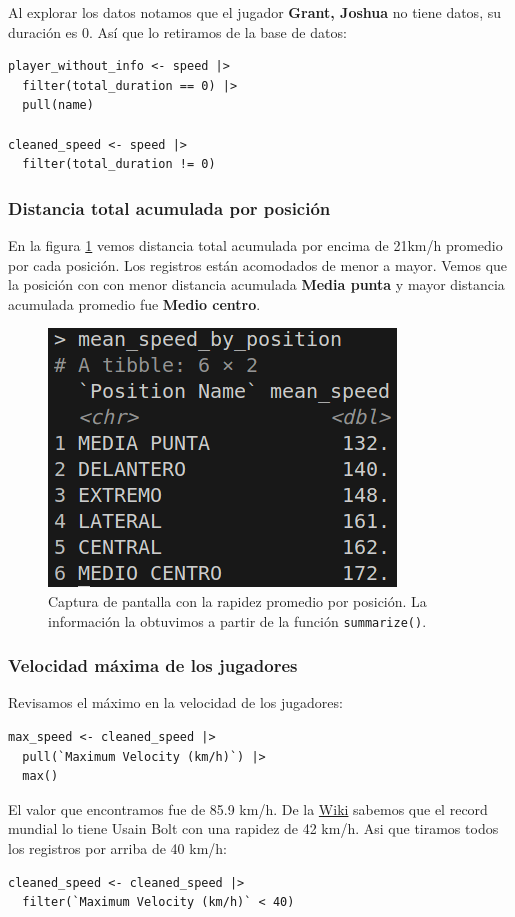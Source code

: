 Al explorar los datos notamos que el jugador \textbf{Grant, Joshua} no tiene datos, su duración es
0. Así que lo retiramos de la base de datos:
\begin{verbatim}
player_without_info <- speed |>
  filter(total_duration == 0) |>
  pull(name)

cleaned_speed <- speed |>
  filter(total_duration != 0)
\end{verbatim}


\subsubsection*{Distancia total acumulada por posición}
En la figura \ref{fig:meanSpeedPosition} vemos distancia total acumulada por encima de 21km/h
promedio por cada posición. Los registros están acomodados de menor a mayor.
Vemos que la posición con con menor distancia acumulada \textbf{Media punta} y mayor distancia
acumulada promedio fue \textbf{Medio centro}.
\begin{figure}[H]
\centering
\includegraphics[scale=0.6]{../static/activity_1_5.png}
\caption{Captura de pantalla con la rapidez promedio por posición. La información la obtuvimos a 
partir de la función \texttt{summarize()}.}
\label{fig:meanSpeedPosition}
\end{figure}

\subsubsection*{Velocidad máxima de los jugadores}
Revisamos el máximo en la velocidad de los jugadores:
\begin{verbatim}
max_speed <- cleaned_speed |>
  pull(`Maximum Velocity (km/h)`) |>
  max()
\end{verbatim}
El valor que encontramos fue de 85.9 km/h. De la
\href{https://es.wikipedia.org/wiki/100_metros}{Wiki} sabemos que el record mundial lo tiene Usain
Bolt con una rapidez de 42 km/h. Asi que tiramos todos los registros por arriba de 40 km/h:
\begin{verbatim}
cleaned_speed <- cleaned_speed |>
  filter(`Maximum Velocity (km/h)` < 40)
\end{verbatim}


